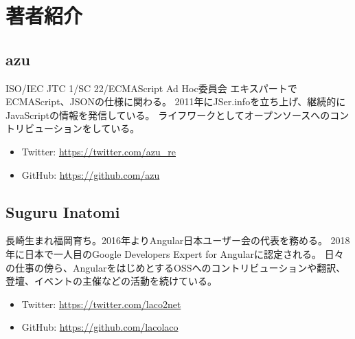 \hypertarget{authors}{%
\chapter*{著者紹介}\label{authors}}
\thispagestyle{frontheadings}

\hypertarget{author-azu}{%
\section*{azu}\label{author-azu}}

ISO/IEC JTC 1/SC 22/ECMAScript Ad Hoc委員会
エキスパートでECMAScript、JSONの仕様に関わる。
2011年にJSer.infoを立ち上げ、継続的にJavaScriptの情報を発信している。
ライフワークとしてオープンソースへのコントリビューションをしている。

\begin{itemize}
\item
  Twitter: \url{https://twitter.com/azu\_re}
\item
  GitHub: \url{https://github.com/azu}
\end{itemize}

\hypertarget{author-suguru-inatomi}{%
\section*{Suguru Inatomi}\label{author-suguru-inatomi}}

長崎生まれ福岡育ち。2016年よりAngular日本ユーザー会の代表を務める。
2018年に日本で一人目のGoogle Developers Expert for Angularに認定される。
日々の仕事の傍ら、AngularをはじめとするOSSへのコントリビューションや翻訳、登壇、イベントの主催などの活動を続けている。

\begin{itemize}
\item
  Twitter: \url{https://twitter.com/laco2net}
\item
  GitHub: \url{https://github.com/lacolaco}
\end{itemize}

